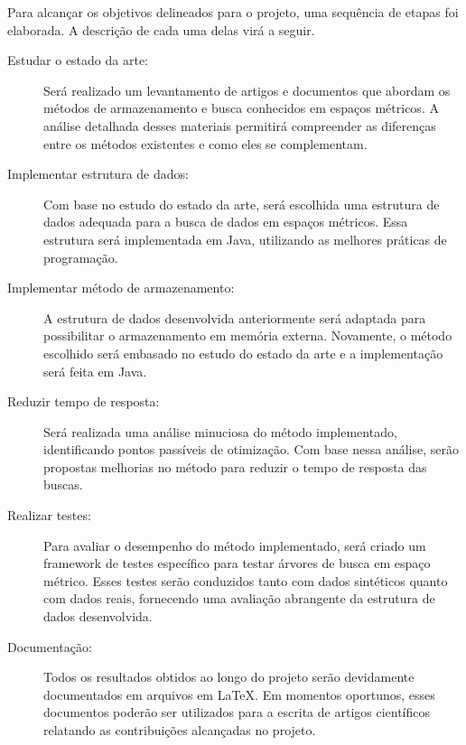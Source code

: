 \documentclass[a4paper,12pt,oneside]{article}
\begin{document}
Para alcançar os objetivos delineados para o projeto, uma sequência de etapas foi elaborada. A descrição de cada uma delas virá a seguir.


\begin{description}

\item [Estudar o estado da arte:] Será realizado um levantamento de artigos e documentos que abordam os métodos de armazenamento e busca conhecidos em espaços métricos. A análise detalhada desses materiais permitirá compreender as diferenças entre os métodos existentes e como eles se complementam.

\item [Implementar estrutura de dados:] Com base no estudo do estado da arte, será escolhida uma estrutura de dados adequada para a busca de dados em espaços métricos. Essa estrutura será implementada em Java, utilizando as melhores práticas de programação.

\item [Implementar método de armazenamento:] A estrutura de dados desenvolvida anteriormente será adaptada para possibilitar o armazenamento em memória externa. Novamente, o método escolhido será embasado no estudo do estado da arte e a implementação será feita em Java.

\item [Reduzir tempo de resposta:] Será realizada uma análise minuciosa do método implementado, identificando pontos passíveis de otimização. Com base nessa análise, serão propostas melhorias no método para reduzir o tempo de resposta das buscas.

\item [Realizar testes:] Para avaliar o desempenho do método implementado, será criado um framework de testes específico para testar árvores de busca em espaço métrico. Esses testes serão conduzidos tanto com dados sintéticos quanto com dados reais, fornecendo uma avaliação abrangente da estrutura de dados desenvolvida.

\item [Documentação:] Todos os resultados obtidos ao longo do projeto serão devidamente documentados em arquivos em LaTeX. Em momentos oportunos, esses documentos poderão ser utilizados para a escrita de artigos científicos relatando as contribuições alcançadas no projeto.

\end{description}



\end{document}
